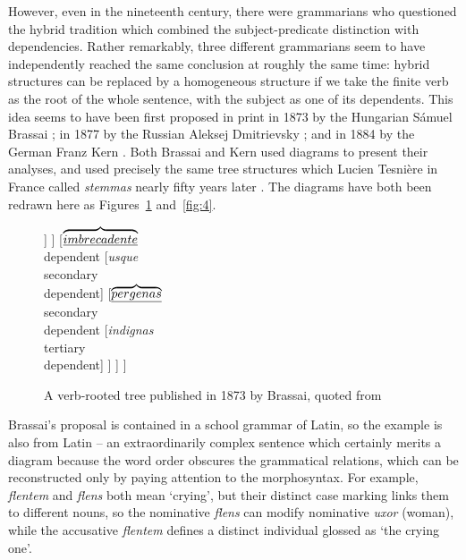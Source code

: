 \documentclass[output=paper
 	        ,biblatex
                ,babelshorthands
                ,newtxmath
                ,draftmode
                ,colorlinks, citecolor=brown
]{langscibook}
\begin{document}
However, even in the nineteenth century, there were grammarians who questioned the hybrid tradition
which combined the subject-predicate distinction with dependencies. Rather remarkably, three
different grammarians seem to have independently reached the same conclusion at roughly the same
time: hybrid structures can be replaced by a homogeneous structure if we take the finite verb as the
root of the whole sentence, with the subject as one of its dependents. This idea seems to have been
first proposed in print in 1873 by the Hungarian Sámuel Brassai
\citep{Imrenyi2013a,ImrenyiVladar2020a-u}; in 1877 by the Russian Aleksej Dmitrievsky
\citep{Seriot2004}; and in 1884 by the German Franz Kern \citep{Kern1884a-u}. Both Brassai and
Kern used diagrams to present their analyses, and used precisely the same tree structures which
Lucien Tesnière in France called \emph{stemmas} nearly fifty years later
\citep{Tesniere59a-u,Tesniere2015a-u}. The diagrams have both been redrawn here as
Figures~\ref{fig:3} and~\ref{fig:4}.

\begin{figure}
	\centering
\begin{forest}
[\emph{tenebat}\\governing verb
	[\emph{flentem}\\dependent]
	[\emph{Uxor}\\dependent
		[\emph{amans}\\attribute]
		[\emph{ipsa}\\attribute]
		[\emph{flens}\\attribute
			[\emph{acrius}\\tertiary\\dependent]
		]
	]
	[$\overbrace{\emph{imbre cadente}}$\\dependent
		[\emph{usque}\\secondary\\dependent]
		[$\overbrace{\emph{per genas}}$\\secondary\\dependent
			[\emph{indignas}\\tertiary\\dependent]
		]
	]
]
\end{forest}
\caption{A verb-rooted tree published in 1873 by Brassai, quoted from }\label{fig:3}
\end{figure}
 
Brassai's proposal is contained in a school grammar of Latin, so the example is also from Latin – an
extraordinarily complex sentence which certainly merits a diagram because the word order obscures the grammatical relations, which can be reconstructed only by paying attention to the morphosyntax. For example, \emph{flentem} and \emph{flens} both mean `crying', but their distinct case marking links them to different nouns, so the nominative \emph{flens} can modify nominative \emph{uxor} (woman), while the accusative \emph{flentem} defines a distinct individual glossed as `the crying one'.
\end{document}
